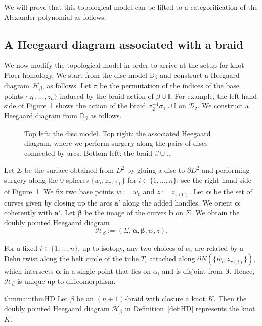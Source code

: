 \documentclass[11pt]{amsart}
\numberwithin{equation}{section}
\numberwithin{figure}{section}
\theoremstyle{definition}
\newcommand{\cD}{\mathcal{D}}
\newcommand{\cH}{\mathcal{H}}
\newcommand{\bD}{\mathbb{D}}
\newcommand{\bI}{\mathbb{I}}
\newcommand{\as}{\boldsymbol{\alpha}}
\newcommand{\bs}{\boldsymbol{\beta}}
\newcommand{\ba}{\boldsymbol{a}}
\newcommand{\bb}{\boldsymbol{b}}
\begin{document}
We will prove that this topological model can be lifted to a categorification of the Alexander polynomial as follows.

\subsection{A Heegaard diagram associated with a braid}
We now modify the topological model in order to arrive at the setup for knot Floer homology. We start from the disc model $\bD_\beta$ and construct a Heegaard diagram $\cH_\beta$, as follows. Let $\pi$ be the permutation of the indices of the base points $\{z_0,\dots,z_n\}$ induced by the braid action of $\beta \cup \bI$. For example, the left-hand side of Figure~\ref{FigHS} shows the action of the braid $\sigma_2^{-1}\sigma_1 \cup \bI$ on $\cD_2$. We construct a Heegaard diagram from $\bD_\beta$ as follows.

\begin{figure}
\centering
\def\svgwidth{\textwidth}

\caption{Top left: the disc model. Top right: the associated Heegaard diagram, where we perform surgery along the pairs of discs connected by arcs. Bottom left: the braid $\beta \cup \bI$.} 
\label{FigHS}
\end{figure}

\begin{defn}\label{def:HD}
Let $\Sigma$ be the surface obtained from $D^2$ by gluing a disc to $\partial D^2$ and performing surgery along the 0-spheres $\{w_i,z_{\pi(i)}\}$ for $i \in \{1,\dots,n\}$; see the right-hand side of Figure~\ref{FigHS}. We fix two base points $w := w_0$ and $z := z_{\pi{(0)}}$. Let $\as$ be the set of curves given by closing up the arcs $\ba'$ along the added handles. We orient $\as$ coherently with $\ba'$. Let $\bs$ be the image of the curves $\bb$ on $\Sigma$. We obtain the doubly pointed Heegaard diagram
\[
\cH_{\beta} := (\Sigma, \as, \bs, w, z).
\]
\end{defn}

For a fixed $i \in \{1,\dots,n\}$, up to isotopy, any two choices of $\alpha_i$ are related by a Dehn twist along the belt circle of the tube $T_i$ attached along $\partial N(\{w_i,z_{\pi(i)}\})$, which intersects $\as$ in a single point that lies on $\alpha_i$ and is disjoint from $\bs$. Hence, $\cH_\beta$ is unique up to diffeomorphism.

\begin{restatable}{thm}{mainthmHD}
\label{THD} 
Let $\beta$ be an $(n+1)$-braid with closure a knot $K$. Then the doubly pointed Heegaard diagram $\mathscr H_{\beta}$ in Definition~\ref{def:HD} represents the knot $K$.
\end{restatable}
\end{document}
